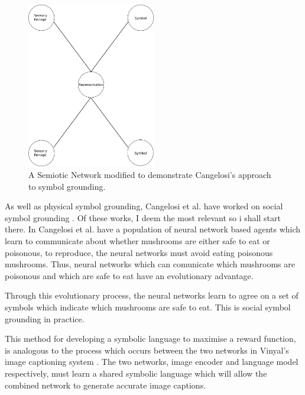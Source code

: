 \begin{figure}
\centering
\includegraphics[width=0.5\textwidth]{Figs/litReview/semioticNetPercept.png}
\caption{A Semiotic Network modified to demonstrate Cangelosi's approach to symbol grounding.}
\label{fig:percNet}

\end{figure}


As well as physical symbol grounding, Cangelosi et al. have worked on social symbol grounding \cite{cangelosi2001adaptive, cangelosi2002symbol, cangelosi1998emergence, horst2019object, cangelosi2018speech, cangelosi2008italk, broz2014italk}. Of these works, I deem \cite{cangelosi1998emergence} the most relevant so i shall start there. In \cite{cangelosi1998emergence} Cangelosi et al. have a population of neural network based agents which learn to communicate about whether mushrooms are either safe to eat or poisonous, to reproduce, the neural networks must avoid eating poisonous mushrooms. Thus, neural networks which can comunicate which mushrooms are poisonous and which are safe to eat have an evolutionary advantage. 

Through this evolutionary process, the neural networks learn to agree on a set of symbols which indicate which mushrooms are safe to eat. This is social symbol grounding in practice. 

This method for developing a symbolic language to maximise a reward function, is analogous to the process which occurs between the two networks in Vinyal's image captioning system \cite{vinyals2015show}.  The two networks, image encoder and language model respectively, must learn a shared symbolic language which will allow the combined network to generate accurate image captions.


